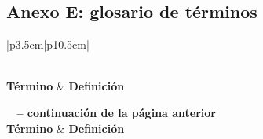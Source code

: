 \subsection{Anexo E: glosario de términos}

\begin{longtable}{|p{3.5cm}|p{10.5cm}|}
\caption{Glosario de Términos Técnicos} \\
\hline
\textbf{Término} & \textbf{Definición} \\ \hline
\endfirsthead

%
{{\bfseries \tablename\ \thetable{} -- continuación de la página anterior}} \\
\hline
\textbf{Término} & \textbf{Definición} \\ \hline
\endhead

\hline {} \\ \hline
\endfoot


\end{longtable}
